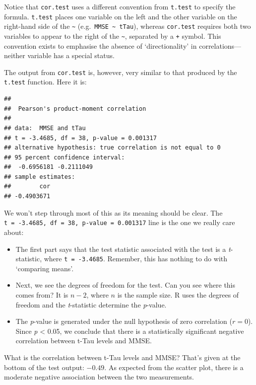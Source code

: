 \documentclass[
]{book}
\providecommand{\tightlist}{%
  \setlength{\itemsep}{0pt}\setlength{\parskip}{0pt}}
\begin{document}
Notice that \texttt{cor.test} uses a different convention from \texttt{t.test} to specify the formula. \texttt{t.test} places one variable on the left and the other variable on the right-hand side of the \texttt{\textasciitilde{}} (e.g.~\texttt{MMSE\ \textasciitilde{}\ tTau}), whereas \texttt{cor.test} requires both two variables to appear to the right of the \texttt{\textasciitilde{}}, separated by a \texttt{+} symbol. This convention exists to emphasise the absence of `directionality' in correlations---neither variable has a special status.

The output from \texttt{cor.test} is, however, very similar to that produced by the \texttt{t.test} function. Here it is:

\begin{verbatim}
## 
##  Pearson's product-moment correlation
## 
## data:  MMSE and tTau
## t = -3.4685, df = 38, p-value = 0.001317
## alternative hypothesis: true correlation is not equal to 0
## 95 percent confidence interval:
##  -0.6956181 -0.2111049
## sample estimates:
##        cor 
## -0.4903671
\end{verbatim}

We won't step through most of this as its meaning should be clear. The \texttt{t\ =\ -3.4685,\ df\ =\ 38,\ p-value\ =\ 0.001317} line is the one we really care about:

\begin{itemize}
\tightlist
\item
  The first part says that the test statistic associated with the test is a \emph{t}-statistic, where \texttt{t\ =\ -3.4685}. Remember, this has nothing to do with `comparing means'.
\item
  Next, we see the degrees of freedom for the test. Can you see where this comes from? It is \(n-2\), where \(n\) is the sample size. R uses the degrees of freedom and the \emph{t}-statistic determine the \emph{p}-value.
\item
  The \emph{p}-value is generated under the null hypothesis of zero correlation (\(r = 0\)). Since \emph{p} \textless{} 0.05, we conclude that there is a statistically significant negative correlation between t-Tau levels and MMSE.
\end{itemize}

What is the correlation between t-Tau levels and MMSE? That's given at the bottom of the test output: \(-0.49\). As expected from the scatter plot, there is a moderate negative association between the two measurements.
\end{document}
